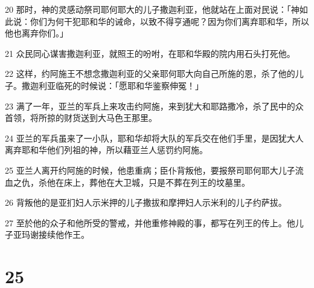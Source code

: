 \par 20 那时，神的灵感动祭司耶何耶大的儿子撒迦利亚，他就站在上面对民说：「神如此说：你们为何干犯耶和华的诫命，以致不得亨通呢？因为你们离弃耶和华，所以他也离弃你们。」
\par 21 众民同心谋害撒迦利亚，就照王的吩咐，在耶和华殿的院内用石头打死他。
\par 22 这样，约阿施王不想念撒迦利亚的父亲耶何耶大向自己所施的恩，杀了他的儿子。撒迦利亚临死的时候说：「愿耶和华鉴察伸冤！」
\par 23 满了一年，亚兰的军兵上来攻击约阿施，来到犹大和耶路撒冷，杀了民中的众首领，将所掠的财货送到大马色王那里。
\par 24 亚兰的军兵虽来了一小队，耶和华却将大队的军兵交在他们手里，是因犹大人离弃耶和华他们列祖的神，所以藉亚兰人惩罚约阿施。
\par 25 亚兰人离开约阿施的时候，他患重病；臣仆背叛他，要报祭司耶何耶大儿子流血之仇，杀他在床上，葬他在大卫城，只是不葬在列王的坟墓里。
\par 26 背叛他的是亚扪妇人示米押的儿子撒拔和摩押妇人示米利的儿子约萨拔。
\par 27 至於他的众子和他所受的警戒，并他重修神殿的事，都写在列王的传上。他儿子亚玛谢接续他作王。

\chapter{25}

